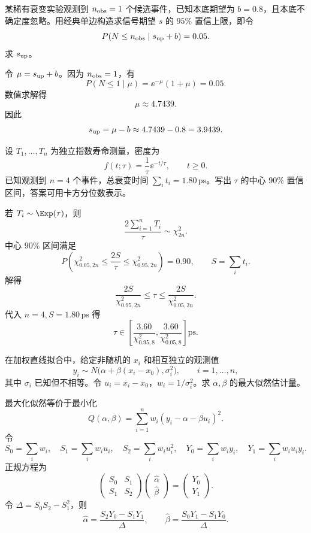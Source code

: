 \begin{question}
某稀有衰变实验观测到 $n_{\rm obs}=1$ 个候选事件，已知本底期望为 $b=0.8$，且本底不确定度忽略。用经典单边构造求信号期望 $s$ 的 $95\%$ 置信上限，即令
\[
P(N\le n_{\rm obs}\mid s_{\rm up}+b)=0.05.
\]
求 $s_{\rm up}$。
\begin{solution}
令 $\mu=s_{\rm up}+b$。因为 $n_{\rm obs}=1$，有
\[
P(N\le1\mid\mu)=\ee^{-\mu}(1+\mu)=0.05.
\]
数值求解得
\[
\mu\approx4.7439.
\]
因此
\[
s_{\rm up}=\mu-b\approx4.7439-0.8=3.9439.
\]
\end{solution}
\end{question}

\begin{question}
设 $T_1,\ldots,T_n$ 为独立指数寿命测量，密度为
\[
f(t;\tau)=\frac1\tau\ee^{-t/\tau},\qquad t\ge0.
\]
已知观测到 $n=4$ 个事件，总衰变时间 $\sum_i t_i=1.80\,\mathrm{ps}$。写出 $\tau$ 的中心 $90\%$ 置信区间，答案可用卡方分位数表示。
\begin{solution}
若 $T_i\sim\Exp(\tau)$，则
\[
\frac{2\sum_{i=1}^n T_i}{\tau}\sim\chi^2_{2n}.
\]
中心 $90\%$ 区间满足
\[
P\!\left(\chi^2_{0.05,2n}\le\frac{2S}{\tau}\le\chi^2_{0.95,2n}\right)=0.90,
\qquad S=\sum_i t_i.
\]
解得
\[
\frac{2S}{\chi^2_{0.95,2n}}\le\tau\le
\frac{2S}{\chi^2_{0.05,2n}}.
\]
代入 $n=4,S=1.80\,\mathrm{ps}$ 得
\[
\tau\in\left[
\frac{3.60}{\chi^2_{0.95,8}},
\frac{3.60}{\chi^2_{0.05,8}}
\right]\mathrm{ps}.
\]
\end{solution}
\end{question}

\begin{question}
在加权直线拟合中，给定非随机的 $x_i$ 和相互独立的观测值
\[
y_i\sim N\bigl(\alpha+\beta(x_i-x_0),\sigma_i^2\bigr),
\qquad i=1,\ldots,n,
\]
其中 $\sigma_i$ 已知但不相等。令 $u_i=x_i-x_0$，$w_i=1/\sigma_i^2$。求 $\alpha,\beta$ 的最大似然估计量。
\begin{solution}
最大化似然等价于最小化
\[
Q(\alpha,\beta)=\sum_{i=1}^n w_i(y_i-\alpha-\beta u_i)^2.
\]
令
\[
S_0=\sum_iw_i,
\quad S_1=\sum_iw_iu_i,
\quad S_2=\sum_iw_iu_i^2,
\quad Y_0=\sum_iw_iy_i,
\quad Y_1=\sum_iw_iu_iy_i.
\]
正规方程为
\[
\begin{pmatrix}S_0&S_1\\S_1&S_2\end{pmatrix}
\begin{pmatrix}\hat\alpha\\\hat\beta\end{pmatrix}
=\begin{pmatrix}Y_0\\Y_1\end{pmatrix}.
\]
令 $\Delta=S_0S_2-S_1^2$，则
\[
\hat\alpha=\frac{S_2Y_0-S_1Y_1}{\Delta},
\qquad
\hat\beta=\frac{S_0Y_1-S_1Y_0}{\Delta}.
\]
\end{solution}
\end{question}

